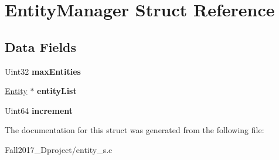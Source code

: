 \hypertarget{struct_entity_manager}{}\section{Entity\+Manager Struct Reference}
\label{struct_entity_manager}
\subsection*{Data Fields}
\begin{DoxyCompactItemize}
\item 
\mbox{\label{struct_entity_manager_a8c3b6b23ab8d7bd613ded00f7bd3ca9c}} 
Uint32 {\bfseries max\+Entities}
\item 
\mbox{\label{struct_entity_manager_ac4bd9b874e2801436da5eaa819b87170}} 
\hyperlink{structentity__s}{Entity} $\ast$ {\bfseries entity\+List}
\item 
\mbox{\label{struct_entity_manager_ab08657e2d8ce2eb598d448722ef0959b}} 
Uint64 {\bfseries increment}
\end{DoxyCompactItemize}


The documentation for this struct was generated from the following file\+:\begin{DoxyCompactItemize}
\item 
Fall2017\+\_\+Dproject/entity\+\_\+s.\+c\end{DoxyCompactItemize}
